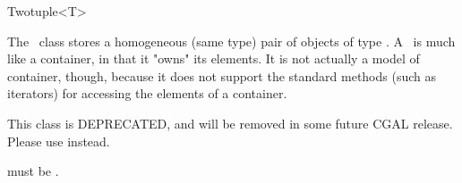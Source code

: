 \begin{ccRefClass}{Twotuple<T>}
  
  \ccDefinition The \ccRefName\ class stores a homogeneous (same type) pair
  of objects of type .  A \ccRefName\ is much like a container, in that
  it "owns" its elements. It is not actually a model of container, though,
  because it does not support the standard methods (such as iterators) for
  accessing the elements of a container.

  This class is DEPRECATED, and will be removed in some future CGAL release.
  Please use  instead.

  
  \ccRequirements {} must be .


  \ccTypes

  \ccGlue

  \ccCreation
  
  
  
\end{ccRefClass}


